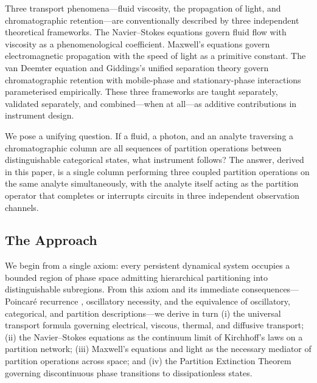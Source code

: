 \documentclass[twocolumn,10pt,a4paper]{article}
\theoremstyle{definition}
\theoremstyle{remark}
\begin{document}
Three transport phenomena---fluid viscosity, the propagation of light, and chromatographic retention---are conventionally described by three independent theoretical frameworks. The Navier--Stokes equations \citep{navier1827,stokes1845} govern fluid flow with viscosity as a phenomenological coefficient. Maxwell's equations \citep{maxwell1873,jackson1999} govern electromagnetic propagation with the speed of light as a primitive constant. The van Deemter equation \citep{vandeemter1956} and Giddings's unified separation theory \citep{giddings1991} govern chromatographic retention with mobile-phase and stationary-phase interactions parameterised empirically. These three frameworks are taught separately, validated separately, and combined---when at all---as additive contributions in instrument design.

We pose a unifying question. If a fluid, a photon, and an analyte traversing a chromatographic column are all sequences of partition operations between distinguishable categorical states, what instrument follows? The answer, derived in this paper, is a single column performing three coupled partition operations on the same analyte simultaneously, with the analyte itself acting as the partition operator that completes or interrupts circuits in three independent observation channels.

\subsection{The Approach}

We begin from a single axiom: every persistent dynamical system occupies a bounded region of phase space admitting hierarchical partitioning into distinguishable subregions. From this axiom and its immediate consequences---Poincar\'{e} recurrence \citep{poincare1890}, oscillatory necessity, and the equivalence of oscillatory, categorical, and partition descriptions---we derive in turn (i) the universal transport formula governing electrical, viscous, thermal, and diffusive transport; (ii) the Navier--Stokes equations as the continuum limit of Kirchhoff's laws on a partition network; (iii) Maxwell's equations and light as the necessary mediator of partition operations across space; and (iv) the Partition Extinction Theorem governing discontinuous phase transitions to dissipationless states.
\end{document}
